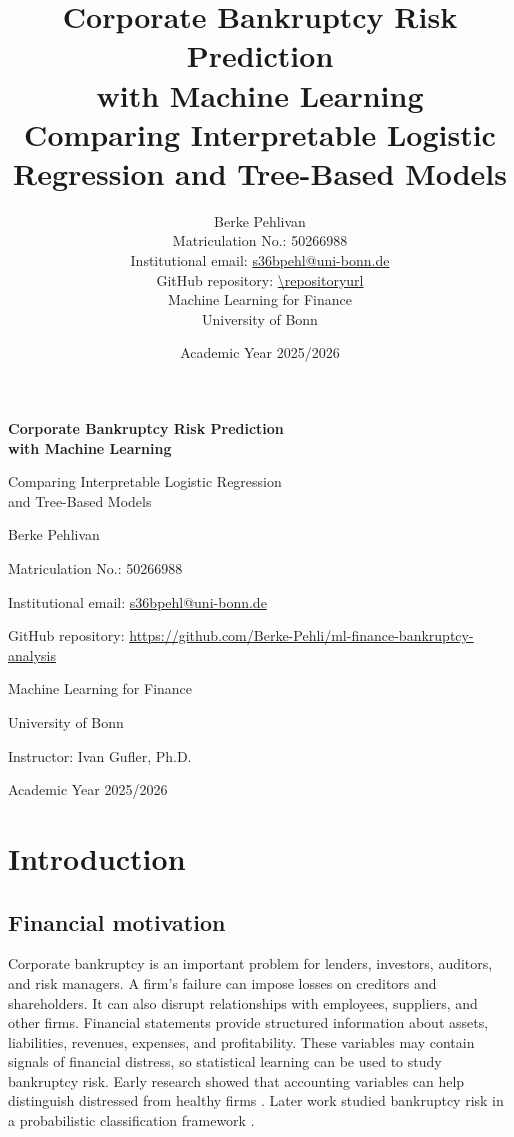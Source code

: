\documentclass[11pt,a4paper]{article}
\title{\textbf{Corporate Bankruptcy Risk Prediction\\with Machine Learning}\\[0.6em]
\large Comparing Interpretable Logistic Regression and Tree-Based Models}
\author{Berke Pehlivan\\
\small Matriculation No.: 50266988\\
\small Institutional email: \href{mailto:s36bpehl@uni-bonn.de}{s36bpehl@uni-bonn.de}\\
\small GitHub repository: \url{\repositoryurl}\\
\small Machine Learning for Finance\\
\small University of Bonn}
\date{Academic Year 2025/2026}
\newcommand{\repositoryurl}{https://github.com/Berke-Pehli/ml-finance-bankruptcy-analysis}
\begin{document}

\begin{titlepage}
  \centering
  \vspace*{2.5cm}
  {\LARGE\bfseries Corporate Bankruptcy Risk Prediction\\[0.25em]
  with Machine Learning\par}
  \vspace{0.8cm}
  {\large Comparing Interpretable Logistic Regression\\
  and Tree-Based Models\par}
  \vfill
  {\large Berke Pehlivan\par}
  \vspace{0.3cm}
  {\normalsize Matriculation No.: 50266988\par}
  {\normalsize Institutional email: \href{mailto:s36bpehl@uni-bonn.de}{s36bpehl@uni-bonn.de}\par}
  {\normalsize GitHub repository: \url{\repositoryurl}\par}
  \vspace{0.3cm}
  {\normalsize Machine Learning for Finance\par}
  {\normalsize University of Bonn\par}
  {\normalsize Instructor: Ivan Gufler, Ph.D.\par}
  {\normalsize Academic Year 2025/2026\par}
  \vfill
\end{titlepage}


\section{Introduction}
\label{sec:introduction}

\subsection{Financial motivation}

Corporate bankruptcy is an important problem for lenders, investors, auditors,
and risk managers. A firm's failure can impose losses on creditors and
shareholders. It can also disrupt relationships with employees, suppliers, and
other firms. Financial statements provide structured information about assets,
liabilities, revenues, expenses, and profitability. These variables may contain
signals of financial distress, so statistical learning can be used to study
bankruptcy risk. Early research showed
that accounting variables can help distinguish distressed from healthy firms
\citep{altman1968}. Later work studied bankruptcy risk in a probabilistic
classification framework \citep{ohlson1980}.
\end{document}
